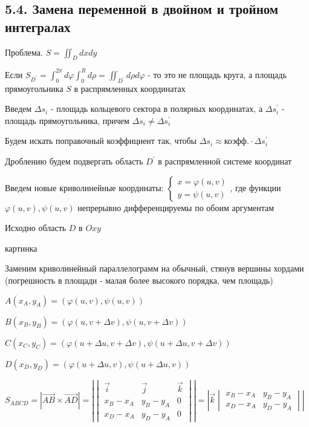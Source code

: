 \documentclass[12pt]{article}
\begin{document}
    \subsection{5.4. Замена переменной в двойном и тройном интегралах}

    \hypertarget{substitutionindoubleintegral}{}

    Проблема. $S = \iint_D dxdy$

    Если $S_{D^\prime} = \int_0^{2\pi} d\varphi \int_0^R d\rho = \iint_{D^\prime} d\rho d\varphi$ - то это не площадь круга, а площадь прямоугольника $S$ в распрямленных координатах

    Введем $\Delta s_i$ - площадь кольцевого сектора в полярных координатах, а $\Delta s^\prime_i$ - площадь прямоугольника, причем $\Delta s_i \neq \Delta s_i^\prime$

    \Nota Будем искать поправочный коэффициент так, чтобы $\Delta s_i \approx \text{коэфф.} \cdot \Delta s_i^\prime$

    Дроблению будем подвергать область $D^\prime$ в распрямленной системе координат

    Введем новые криволинейные координаты: $\begin{cases}
                                                x = \varphi(u, v) \\ y = \psi(u, v)
    \end{cases}$,
    где функции $\varphi(u, v), \psi(u, v)$ непрерывно дифференцируемы по обоим аргументам

    Исходно область $D$ в $Oxy$

    картинка

    Заменим криволинейный параллелограмм на обычный, стянув вершины хордами (погрешность в площади - малая более высокого порядка, чем площадь)

    $A(x_A, y_A) = (\varphi(u, v), \psi(u, v))$

    $B(x_B, y_B) = (\varphi(u, v+\Delta v), \psi(u, v+\Delta v))$

    $C(x_C, y_C) = (\varphi(u + \Delta u, v+\Delta v), \psi(u + \Delta u, v+\Delta v))$

    $D(x_D, y_D) = (\varphi(u + \Delta u, v), \psi(u + \Delta u, v))$

    $S_{ABCD} = |\overrightarrow{AB} \times \overrightarrow{AD}| = \left|
    \begin{vmatrix}
        \overrightarrow{i} & \overrightarrow{j} & \overrightarrow{k} \\
        x_B - x_A          & y_B - y_A          & 0                  \\
        x_D - x_A          & y_D - y_A          & 0
    \end{vmatrix}\right| = \left| \overrightarrow{k}
    \begin{vmatrix}
        x_B - x_A & y_B - y_A \\
        x_D - x_A & y_D - y_A
    \end{vmatrix}\right|$
\end{document}
